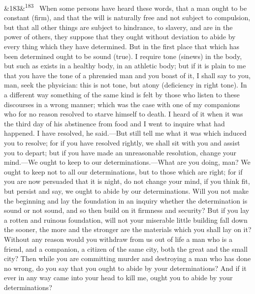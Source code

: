 \documentclass[12pt]{article}
\newcommand{\para}[1][]{\par\noindent\ifx&#1&\else\textsuperscript{\footnotesize #1}~\fi}
\begin{document}
\para[183] When some persons have heard these words, that a man ought to be constant (firm), and that the will is naturally free and not subject to compulsion, but that all other things are subject to hindrance, to slavery, and are in the power of others, they suppose that they ought without deviation to abide by every thing which they have determined. But in the first place that which has been determined ought to be sound (true). I require tone (sinews) in the body, but such as exists in a healthy body, in an athletic body; but if it is plain to me that you have the tone of a phrensied man and you boast of it, I shall say to you, man, seek the physician: this is not tone, but atony (deficiency in right tone). In a different way something of the same kind is felt by those who listen to these discourses in a wrong manner; which was the case with one of my companions who for no reason resolved to starve himself to death. I heard of it when it was the third day of his abstinence from food and I went to inquire what had happened. I have resolved, he said.—But still tell me what it was which induced you to resolve; for if you have resolved rightly, we shall sit with you and assist you to depart; but if you have made an unreasonable resolution, change your mind.—We ought to keep to our determinations.—What are you doing, man? We ought to keep not to all our determinations, but to those which are right; for if you are now persuaded that it is night, do not change your mind, if you think fit, but persist and say, we ought to abide by our determinations. Will you not make the beginning and lay the foundation in an inquiry whether the determination is sound or not sound, and so then build on it firmness and security? But if you lay a rotten and ruinous foundation, will not your miserable little building fall down the sooner, the more and the stronger are the materials which you shall lay on it? Without any reason would you withdraw from us out of life a man who is a friend, and a companion, a citizen of the same city, both the great and the small city? Then while you are committing murder and destroying a man who has done no wrong, do you say that you ought to abide by your determinations? And if it ever in any way came into your head to kill me, ought you to abide by your determinations?
\end{document}
